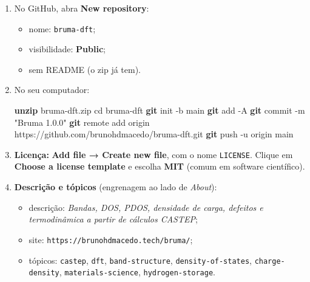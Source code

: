 \documentclass[
  10pt,
]{article}
\newenvironment{Shaded}{\begin{snugshade}}{\end{snugshade}}
\newcommand{\AttributeTok}[1]{\textcolor[rgb]{0.13,0.29,0.53}{#1}}
\newcommand{\BuiltInTok}[1]{#1}
\newcommand{\FunctionTok}[1]{\textcolor[rgb]{0.13,0.29,0.53}{\textbf{#1}}}
\newcommand{\NormalTok}[1]{#1}
\newcommand{\StringTok}[1]{\textcolor[rgb]{0.31,0.60,0.02}{#1}}
\providecommand{\tightlist}{%
  \setlength{\itemsep}{0pt}\setlength{\parskip}{0pt}}
\begin{document}
\begin{enumerate}
\def\labelenumi{\arabic{enumi}.}
\item
  No GitHub, abra \textbf{New repository}:

  \begin{itemize}
  \tightlist
  \item
    nome: \texttt{bruma-\allowbreak{}dft};
  \item
    visibilidade: \textbf{Public};
  \item
    sem README (o zip já tem).
  \end{itemize}
\item
  No seu computador:

\begin{Shaded}
\begin{Highlighting}[]
\FunctionTok{unzip}\NormalTok{ bruma{-}dft.zip}
\BuiltInTok{cd}\NormalTok{ bruma{-}dft}
\FunctionTok{git}\NormalTok{ init }\AttributeTok{{-}b}\NormalTok{ main}
\FunctionTok{git}\NormalTok{ add }\AttributeTok{{-}A}
\FunctionTok{git}\NormalTok{ commit }\AttributeTok{{-}m} \StringTok{"Bruma 1.0.0"}
\FunctionTok{git}\NormalTok{ remote add origin https://github.com/brunohdmacedo/bruma{-}dft.git}
\FunctionTok{git}\NormalTok{ push }\AttributeTok{{-}u}\NormalTok{ origin main}
\end{Highlighting}
\end{Shaded}
\item
  \textbf{Licença:} \textbf{Add file → Create new file}, com o nome
  \texttt{LICENSE}. Clique em \textbf{Choose a license template} e
  escolha \textbf{MIT} (comum em software científico).
\item
  \textbf{Descrição e tópicos} (engrenagem ao lado de \emph{About}):

  \begin{itemize}
  \tightlist
  \item
    descrição: \emph{Bandas, DOS, PDOS, densidade de carga, defeitos e
    termodinâmica a partir de cálculos CASTEP};
  \item
    site:
    \texttt{https:\allowbreak{}/\allowbreak{}/\allowbreak{}brunohdmacedo.\allowbreak{}tech/\allowbreak{}bruma/\allowbreak{}};
  \item
    tópicos: \texttt{castep}, \texttt{dft},
    \texttt{band-\allowbreak{}structure},
    \texttt{density-\allowbreak{}of-\allowbreak{}states},
    \texttt{charge-\allowbreak{}density},
    \texttt{materials-\allowbreak{}science},
    \texttt{hydrogen-\allowbreak{}storage}.
  \end{itemize}
\end{enumerate}
\end{document}

